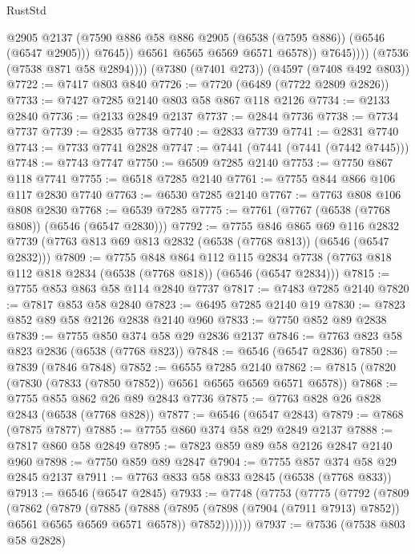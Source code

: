 \begin{lexlean}{RustStd}
\begin{coremodule}
                        @2905
                        @2137
                        (@7590 @886 @58 @886 @2905 (@6538 (@7595 @886)) (@6546 (@6547 @2905)))
                        @7645))
                    @6561
                    @6565
                    @6569
                    @6571
                    @6578))
                @7645))))
        (@7536 (@7538 @871 @58 @2894))))
    (@7380 (@7401 @273))
    (@4597 (@7408 @492 @803))
@7722 := @7417 @803 @840
@7726 := @7720 (@6489 (@7722 @2809 @2826))
@7733 := @7427 @7285 @2140 @803 @58 @867 @118 @2126
@7734 := @2133 @2840
@7736 := @2133 @2849 @2137
@7737 := @2844 @7736
@7738 := @7734 @7737
@7739 := @2835 @7738
@7740 := @2833 @7739
@7741 := @2831 @7740
@7743 := @7733 @7741 @2828
@7747 := @7441 (@7441 (@7441 (@7442 @7445)))
@7748 := @7743 @7747
@7750 := @6509 @7285 @2140
@7753 := @7750 @867 @118 @7741
@7755 := @6518 @7285 @2140
@7761 := @7755 @844 @866 @106 @117 @2830 @7740
@7763 := @6530 @7285 @2140
@7767 := @7763 @808 @106 @808 @2830
@7768 := @6539 @7285
@7775 := @7761 (@7767 (@6538 (@7768 @808)) (@6546 (@6547 @2830)))
@7792 := @7755
    @846
    @865
    @69
    @116
    @2832
    @7739
    (@7763 @813 @69 @813 @2832 (@6538 (@7768 @813)) (@6546 (@6547 @2832)))
@7809 := @7755
    @848
    @864
    @112
    @115
    @2834
    @7738
    (@7763 @818 @112 @818 @2834 (@6538 (@7768 @818)) (@6546 (@6547 @2834)))
@7815 := @7755 @853 @863 @58 @114 @2840 @7737
@7817 := @7483 @7285 @2140
@7820 := @7817 @853 @58 @2840
@7823 := @6495 @7285 @2140 @19
@7830 := @7823 @852 @89 @58 @2126 @2838 @2140 @960
@7833 := @7750 @852 @89 @2838
@7839 := @7755 @850 @374 @58 @29 @2836 @2137
@7846 := @7763 @823 @58 @823 @2836 (@6538 (@7768 @823))
@7848 := @6546 (@6547 @2836)
@7850 := @7839 (@7846 @7848)
@7852 := @6555 @7285 @2140
@7862 := @7815 (@7820 (@7830 (@7833 (@7850 @7852)) @6561 @6565 @6569 @6571 @6578))
@7868 := @7755 @855 @862 @26 @89 @2843 @7736
@7875 := @7763 @828 @26 @828 @2843 (@6538 (@7768 @828))
@7877 := @6546 (@6547 @2843)
@7879 := @7868 (@7875 @7877)
@7885 := @7755 @860 @374 @58 @29 @2849 @2137
@7888 := @7817 @860 @58 @2849
@7895 := @7823 @859 @89 @58 @2126 @2847 @2140 @960
@7898 := @7750 @859 @89 @2847
@7904 := @7755 @857 @374 @58 @29 @2845 @2137
@7911 := @7763 @833 @58 @833 @2845 (@6538 (@7768 @833))
@7913 := @6546 (@6547 @2845)
@7933 := @7748
    (@7753
      (@7775
        (@7792
          (@7809
            (@7862
              (@7879
                (@7885
                  (@7888 (@7895 (@7898 (@7904 (@7911 @7913) @7852)) @6561 @6565 @6569 @6571 @6578))
                  @7852)))))))
@7937 := @7536 (@7538 @803 @58 @2828)

\end{coremodule}
\end{lexlean}
